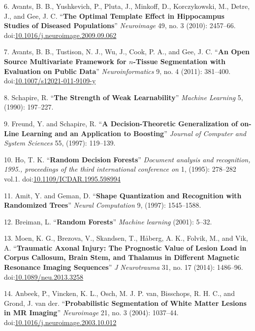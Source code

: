 \documentclass[12pt,]{article}
\begin{document}
\hypertarget{ref-Avants:2010aa}{}
6. Avants, B. B., Yushkevich, P., Pluta, J., Minkoff, D., Korczykowski,
M., Detre, J., and Gee, J. C. ``\textbf{The Optimal Template Effect in
Hippocampus Studies of Diseased Populations}'' \emph{Neuroimage} 49, no.
3 (2010): 2457--66.
doi:\href{https://doi.org/10.1016/j.neuroimage.2009.09.062}{10.1016/j.neuroimage.2009.09.062}

\hypertarget{ref-Avants:2011aa}{}
7. Avants, B. B., Tustison, N. J., Wu, J., Cook, P. A., and Gee, J. C.
``\textbf{An Open Source Multivariate Framework for \(n\)-Tissue
Segmentation with Evaluation on Public Data}'' \emph{Neuroinformatics}
9, no. 4 (2011): 381--400.
doi:\href{https://doi.org/10.1007/s12021-011-9109-y}{10.1007/s12021-011-9109-y}

\hypertarget{ref-schapire1990}{}
8. Schapire, R. ``\textbf{The Strength of Weak Learnability}''
\emph{Machine Learning} 5, (1990): 197--227.

\hypertarget{ref-freund1997}{}
9. Freund, Y. and Schapire, R. ``\textbf{A Decision-Theoretic
Generalization of on-Line Learning and an Application to Boosting}''
\emph{Journal of Computer and System Sciences} 55, (1997): 119--139.

\hypertarget{ref-ho1995}{}
10. Ho, T. K. ``\textbf{Random Decision Forests}'' \emph{Document
analysis and recognition, 1995., proceedings of the third international
conference on} 1, (1995): 278--282 vol.1.
doi:\href{https://doi.org/10.1109/ICDAR.1995.598994}{10.1109/ICDAR.1995.598994}

\hypertarget{ref-amit1997}{}
11. Amit, Y. and Geman, D. ``\textbf{Shape Quantization and Recognition
with Randomized Trees}'' \emph{Neural Computation} 9, (1997):
1545--1588.

\hypertarget{ref-breiman2001}{}
12. Breiman, L. ``\textbf{Random Forests}'' \emph{Machine learning}
(2001): 5--32.

\hypertarget{ref-Moen:2014aa}{}
13. Moen, K. G., Brezova, V., Skandsen, T., Håberg, A. K., Folvik, M.,
and Vik, A. ``\textbf{Traumatic Axonal Injury: The Prognostic Value of
Lesion Load in Corpus Callosum, Brain Stem, and Thalamus in Different
Magnetic Resonance Imaging Sequences}'' \emph{J Neurotrauma} 31, no. 17
(2014): 1486--96.
doi:\href{https://doi.org/10.1089/neu.2013.3258}{10.1089/neu.2013.3258}

\hypertarget{ref-Anbeek:2004aa}{}
14. Anbeek, P., Vincken, K. L., Osch, M. J. P. van, Bisschops, R. H. C.,
and Grond, J. van der. ``\textbf{Probabilistic Segmentation of White
Matter Lesions in MR Imaging}'' \emph{Neuroimage} 21, no. 3 (2004):
1037--44.
doi:\href{https://doi.org/10.1016/j.neuroimage.2003.10.012}{10.1016/j.neuroimage.2003.10.012}
\end{document}

